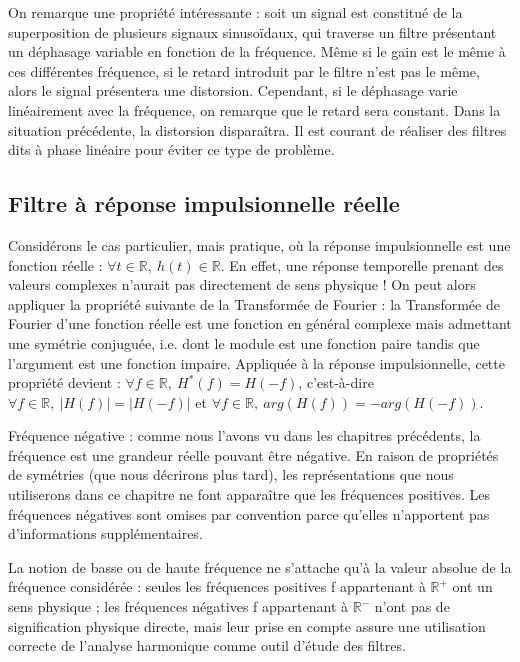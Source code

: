 \documentclass[]{report}
\begin{document}
	On remarque une propriété intéressante : soit un signal est constitué de la superposition de plusieurs signaux sinusoïdaux, qui traverse un filtre présentant un déphasage variable en fonction de la fréquence. Même si le gain est le même à ces différentes fréquence, si le retard introduit par le filtre n'est pas le même, alors le signal présentera une distorsion.
	Cependant, si le déphasage varie linéairement avec la fréquence, on remarque que le retard sera constant. Dans la situation précédente, la distorsion disparaîtra. Il est courant de réaliser des filtres dits à phase linéaire pour éviter ce type de problème.
	
	\subsection{Filtre à réponse impulsionnelle réelle}
	Considérons le cas particulier, mais pratique, où la réponse impulsionnelle est une fonction réelle : $ \forall t \in \mathbb{R},~h(t) \in \mathbb{R}$. En effet, une réponse temporelle prenant des valeurs complexes n’aurait pas directement de sens physique ! On peut alors appliquer la propriété suivante de la Transformée de Fourier : la Transformée de Fourier d’une fonction réelle est une fonction en général complexe mais admettant une symétrie conjuguée, i.e. dont le module est une fonction paire tandis que l’argument est une fonction impaire. Appliquée à la réponse impulsionnelle, cette propriété devient : $\forall f \in \mathbb{R},~H^{*}(f) = H(-f)$, c'est-à-dire $\forall f \in \mathbb{R},~|H(f)| = |H(-f)|$ et $\forall f \in \mathbb{R},~arg(H(f)) = -arg(H(-f))$.
	
	Fréquence négative : comme nous l'avons vu dans les chapitres précédents, la fréquence est une grandeur réelle pouvant être négative. En raison de propriétés de symétries (que nous décrirons plus tard), les représentations que nous utiliserons dans ce chapitre ne font apparaître que les fréquences positives. Les fréquences négatives sont omises par convention parce qu'elles n'apportent pas d'informations supplémentaires.
	
	La notion de basse ou de haute fréquence ne s’attache qu’à la valeur absolue de la fréquence considérée : seules les fréquences positives f appartenant à $\mathbb{R}^{+}$ ont un sens physique ; les fréquences négatives f appartenant à $\mathbb{R}^{-}$ n’ont pas de signification physique directe, mais leur prise en compte assure une utilisation correcte de l’analyse harmonique comme outil d’étude des filtres.
	
\end{document}

